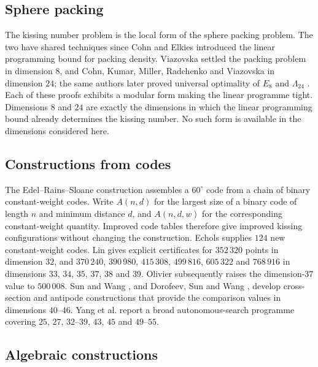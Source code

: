 \documentclass[11pt]{amsart}
\theoremstyle{remark}
\newcommand{\Leech}{\Lambda_{24}}
\begin{document}
\subsection{Sphere packing}\label{ss:rw-packing}

The kissing number problem is the local form of the sphere packing problem. The two
have shared techniques since Cohn and Elkies \cite{cohn-elkies2003} introduced the
linear programming bound for packing density. Viazovska \cite{viazovska2017} settled
the packing problem in dimension $8$, and Cohn, Kumar, Miller, Radchenko and
Viazovska \cite{cohn-kumar-miller-radchenko-viazovska2017} in dimension $24$; the same
authors later proved universal optimality of $E_8$ and $\Leech$
\cite{cohn-kumar-miller-radchenko-viazovska2022}. Each of these proofs exhibits a modular
form making the linear programme tight. Dimensions $8$ and $24$ are exactly the
dimensions in which the linear programming bound already determines the kissing
number. No such form is available
in the dimensions considered here.

\subsection{Constructions from codes}\label{ss:rw-codes}

The Edel--Rains--Sloane construction \cite{edel-rains-sloane1998} assembles a
$60^\circ$ code from a chain of binary constant-weight codes. Write $A(n,d)$ for
the largest size of a binary code of length $n$ and minimum distance $d$, and
$A(n,d,w)$ for the corresponding constant-weight quantity. Improved code tables
therefore give improved kissing configurations without changing the construction.
Echols \cite{echols2026} supplies $124$ new constant-weight codes. Lin
\cite{lin32-2026,lin33-2026} gives explicit certificates for $352\,320$ points
in dimension $32$, and $370\,240$, $390\,980$, $415\,308$, $499\,816$,
$605\,322$ and $768\,916$ in dimensions $33$, $34$, $35$, $37$, $38$ and
$39$. Olivier \cite{olivier2026} subsequently raises the dimension-$37$ value
to $500\,008$. Sun and Wang \cite{sun-wang2026}, and Dorofeev, Sun and Wang
\cite{dorofeev-sun-wang2026}, develop cross-section and antipode constructions
that provide the comparison values in dimensions $40$--$46$. Yang et al.
\cite{yang-etal2026} report a broad autonomous-search programme covering
$25$, $27$, $32$--$39$, $43$, $45$ and $49$--$55$.

\subsection{Algebraic constructions}\label{ss:rw-algebra}
\end{document}
